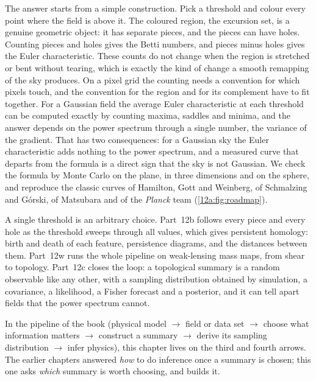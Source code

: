 The answer starts from a simple construction. Pick a threshold and colour every point where the field is
above it. The coloured region, the excursion set, is a genuine geometric object: it has separate pieces,
and the pieces can have holes. Counting pieces and holes gives the Betti numbers, and pieces minus holes
gives the Euler characteristic. These counts do not change when the region is stretched or bent without
tearing, which is exactly the kind of change a smooth remapping of the sky produces. On a pixel grid the
counting needs a convention for which pixels touch, and the convention for the region and for its
complement have to fit together. For a Gaussian field the average Euler characteristic at each threshold
can be computed exactly by counting maxima, saddles and minima, and the answer depends on the power
spectrum through a single number, the variance of the gradient. That has two consequences: for a
Gaussian sky the Euler characteristic adds nothing to the power spectrum, and a measured curve that departs
from the formula is a direct sign that the sky is not Gaussian. We check the formula by Monte Carlo on the
plane, in three dimensions and on the sphere, and reproduce the classic curves of Hamilton, Gott and
Weinberg, of Schmalzing and G\'orski, of Matsubara and of the \textit{Planck} team
(\cref{12a:fig:roadmap}).

A single threshold is an arbitrary choice. Part~12b follows every piece and every hole as the threshold
sweeps through all values, which gives persistent homology: birth and death of each feature, persistence
diagrams, and the distances between them. Part~12w runs the whole pipeline on weak-lensing mass maps,
from shear to topology. Part~12c closes the loop: a topological summary is a random observable like any
other, with a sampling distribution obtained by simulation, a covariance, a likelihood, a Fisher forecast
and a posterior, and it can tell apart fields that the power spectrum cannot.

In the pipeline of the book (physical model $\to$ field or data set $\to$ choose what information matters
$\to$ construct a summary $\to$ derive its sampling distribution $\to$ infer physics), this chapter lives
on the third and fourth arrows. The earlier chapters answered \emph{how} to do inference once a summary is
chosen; this one asks \emph{which} summary is worth choosing, and builds it.

